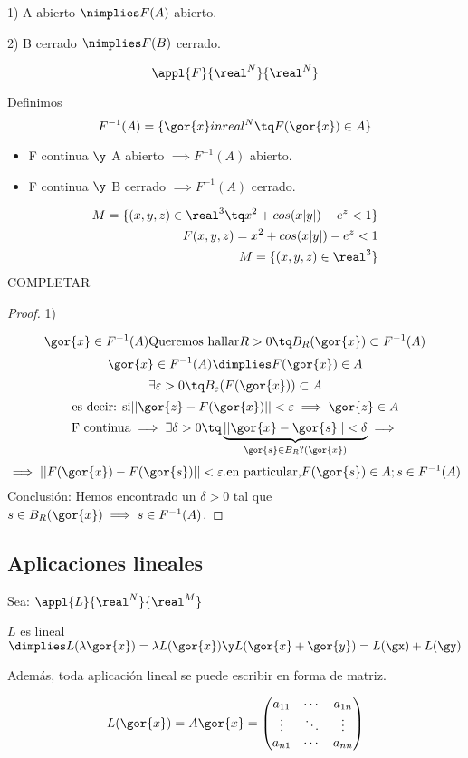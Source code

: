 \documentclass[a4paper,10pt]{apuntes}
\begin{document}
1) A abierto $\nimplies F(A)$ abierto.

2) B cerrado $\nimplies F(B)$ cerrado.

\[\appl{F}{\real^N}{\real^N}\]


Definimos
$$F^{-1} (A) = \{\gor{x}in real^N \tq F(\gor{x})\in A\}$$
\begin{theorem}
\begin{itemize}
\item F continua $\y$ A abierto $\implies F^{-1} (A)$ abierto.
\item F continua $\y$ B cerrado $\implies F^{-1} (A)$ cerrado.
\end{itemize}
\end{theorem}

\app
\begin{align*}
M=\{(x,y,z) \in \real^3 \tq x^2 + cos(x|y|) - e^z < 1 \}\\
F(x,y,z) = x^2 + cos(x|y|) - e^z < 1\\
M=\{(x,y,z) \in \real^3\}
\end{align*}
COMPLETAR

\begin{proof}
1)

\[\gor{x} \in F^{-1} (A) \text{Queremos hallar} R>0 \tq B_R(\gor{x})\subset F^{-1} (A)\]
\[\gor{x}\in F^{-1} (A) \dimplies F(\gor{x})\in A\]
\[\exists \varepsilon>0 \tq B_{\varepsilon}(F(\gor{x}))\subset A\]
\[\text{es decir: si} ||\gor{z}-F(\gor{x})|| < \varepsilon \implies \gor{z}\in A\]
\[\text{F continua} \implies \exists \delta > 0 \tq \underbrace{||\gor{x}-\gor{s}||<\delta}_{\gor{s}\in B_R?(\gor{x})} \implies\]
\[\implies ||F(\gor{x})-F(\gor{s})||<\varepsilon. \text{en particular,} F(\gor{s}) \in A; s \in F^{-1} (A)\]
Conclusión: Hemos encontrado un $\delta > 0$ tal que $s \in B_R(\gor{x}) \implies s \in F^{-1} (A)$.
\end{proof}
\subsection{Aplicaciones lineales}
Sea: $\appl{L}{\real^N}{\real^M}$

$L$ es lineal $\dimplies L(\lambda \gor{x}) = \lambda L(\gor{x}) \y L(\gor{x}+\gor{y}) = L(\gx)+L(\gy)$

Además, toda aplicación lineal se puede escribir en forma de matriz.

\[L(\gor{x})=A\gor{x} =
\begin{pmatrix}
a_{11} 	& \cdots & a_{1n}		\\
\vdots	& \ddots &  \vdots 	\\
a_{n1}	& \cdots & a_{nn} 
\end{pmatrix}\]
\end{document}
